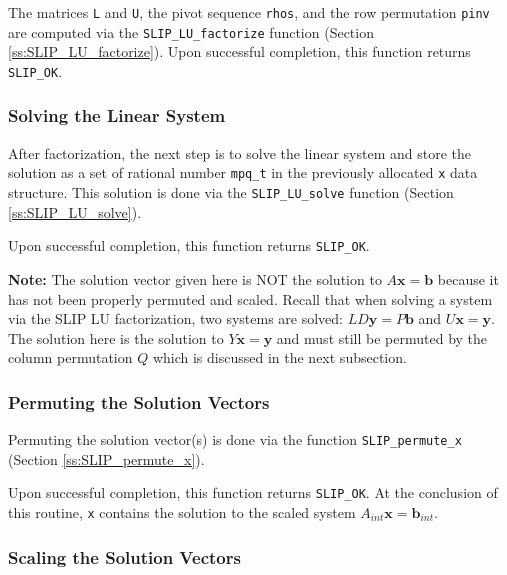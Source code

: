 \documentclass[12pt]{article}
\theoremstyle{definition}
\begin{document}
The matrices \verb|L| and \verb|U|, the pivot sequence \verb|rhos|, and the row
permutation \verb|pinv| are computed via the \verb|SLIP_LU_factorize| function
(Section \ref{ss:SLIP_LU_factorize}).  Upon successful completion, this
function returns \verb|SLIP_OK|.

\subsubsection{Solving the Linear System}

After factorization, the next step is to solve the linear system and store the
solution as a set of rational number \verb|mpq_t| in the previously allocated
\verb|x| data structure. This solution is done via the \verb|SLIP_LU_solve|
function (Section \ref{ss:SLIP_LU_solve}).

Upon successful completion, this function returns \verb|SLIP_OK|.

\textbf{Note:} The solution vector given here is NOT the solution to $A
\mathbf{x} = \mathbf{b}$ because it has not been properly permuted and scaled.
Recall that when solving a system via the SLIP LU factorization, two systems
are solved: $LD \mathbf{y} = P \mathbf{b}$ and $U \mathbf{x} = \mathbf{y}$. The
solution here is the solution to $Y \mathbf{x} = \mathbf{y}$ and must still be
permuted by the column permutation $Q$ which is discussed in the next
subsection.

\subsubsection{Permuting the Solution Vectors}

Permuting the solution vector(s) is done via the function \verb|SLIP_permute_x|
(Section \ref{ss:SLIP_permute_x}).

Upon successful completion, this function returns \verb|SLIP_OK|. At the
conclusion of this routine, \verb|x| contains the solution to the scaled system
$A_{int} \mathbf{x} = \mathbf{b}_{int}$.

\subsubsection{Scaling the Solution Vectors}
\end{document}
